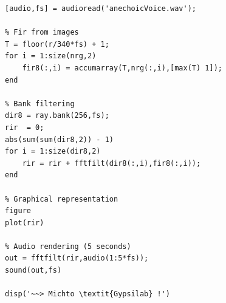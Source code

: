 \documentclass[AMA,STIX1COL]{WileyNJD-v2}
\begin{document}
\begin{lstlisting}[style=Matlab-editor,basicstyle=\footnotesize]
% Audio file
[audio,fs] = audioread('anechoicVoice.wav');

% Fir from images
T = floor(r/340*fs) + 1;
for i = 1:size(nrg,2)
    fir8(:,i) = accumarray(T,nrg(:,i),[max(T) 1]);
end

% Bank filtering
dir8 = ray.bank(256,fs);
rir  = 0;
abs(sum(sum(dir8,2)) - 1)
for i = 1:size(dir8,2)
    rir = rir + fftfilt(dir8(:,i),fir8(:,i));
end

% Graphical representation
figure
plot(rir)

% Audio rendering (5 seconds)
out = fftfilt(rir,audio(1:5*fs));
sound(out,fs)

disp('~~> Michto \textit{Gypsilab} !')

\end{lstlisting}

 







%
%





	

	
		
\end{document}
